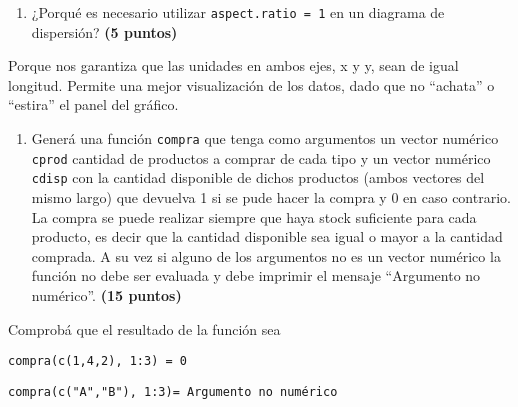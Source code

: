 \documentclass[
]{article}
\providecommand{\tightlist}{%
  \setlength{\itemsep}{0pt}\setlength{\parskip}{0pt}}
\begin{document}
\begin{enumerate}
\def\labelenumi{\arabic{enumi}.}
\setcounter{enumi}{1}
\tightlist
\item
  ¿Porqué es necesario utilizar \texttt{aspect.ratio\ =\ 1} en un
  diagrama de dispersión? \textbf{(5 puntos)}
\end{enumerate}

Porque nos garantiza que las unidades en ambos ejes, x y y, sean de
igual longitud. Permite una mejor visualización de los datos, dado que
no ``achata'' o ``estira'' el panel del gráfico.

\begin{enumerate}
\def\labelenumi{\arabic{enumi}.}
\setcounter{enumi}{2}
\tightlist
\item
  Generá una función \texttt{compra} que tenga como argumentos un vector
  numérico \texttt{cprod} cantidad de productos a comprar de cada tipo y
  un vector numérico \texttt{cdisp} con la cantidad disponible de dichos
  productos (ambos vectores del mismo largo) que devuelva 1 si se pude
  hacer la compra y 0 en caso contrario. La compra se puede realizar
  siempre que haya stock suficiente para cada producto, es decir que la
  cantidad disponible sea igual o mayor a la cantidad comprada. A su vez
  si alguno de los argumentos no es un vector numérico la función no
  debe ser evaluada y debe imprimir el mensaje ``Argumento no
  numérico''. \textbf{(15 puntos)}
\end{enumerate}

Comprobá que el resultado de la función sea

\texttt{compra(c(1,4,2),\ 1:3)\ =\ 0}

\texttt{compra(c("A","B"),\ 1:3)=\ Argumento\ no\ numérico}
\end{document}
